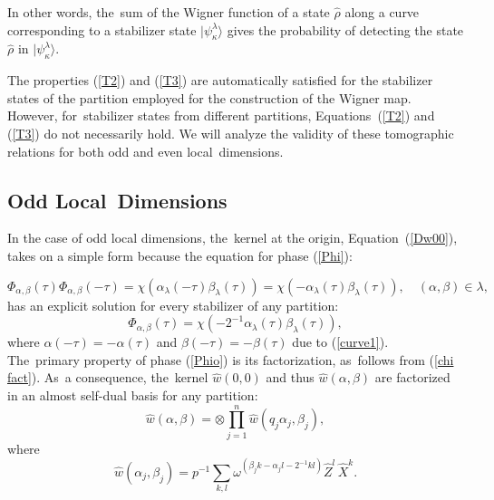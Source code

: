 \documentclass[quantumrep,article,accept,pdftex,moreauthors]{Definitions/mdpi}
\begin{document}
In other words, the~sum of the Wigner function of a state $\hat{\rho}$ along a
curve corresponding to a stabilizer state $|\psi_{\kappa}^{\lambda}\rangle$
gives the probability of detecting the state $\hat{\rho}$ in
$|\psi_{\kappa}^{\lambda}\rangle$.

The properties (\ref{T2}) and (\ref{T3}) are automatically satisfied for the
stabilizer states of the partition employed for the construction of the Wigner
map. However, for~stabilizer states from different partitions, Equations~(\ref{T2})
and (\ref{T3}) do not necessarily hold. We will analyze the validity of these
tomographic relations for both odd and even local~dimensions.

\subsection{Odd Local~Dimensions}

In the case of odd local dimensions, the~kernel at the origin, Equation~(\ref{Dw00}),
takes on a simple form because the equation for  phase (\ref{Phi}): 

\begin{equation*}
  \Phi_{\alpha,\beta}(\tau) \Phi_{\alpha,\beta}(-\tau)
  = \chi\left(\alpha_{\lambda}(-\tau)\beta_{\lambda}(\tau)\right)
  = \chi\left(-\alpha_{\lambda}(\tau)\beta_{\lambda}(\tau)\right),
  \quad (\alpha,\beta) \in \lambda,
\end{equation*}
has an explicit solution for every stabilizer of any partition:
\begin{equation}
  \Phi_{\alpha,\beta }(\tau)
  = \chi\left( -2^{-1}\alpha_{\lambda}(\tau)\beta_{\lambda}(\tau)\right),
  \label{Phio}
\end{equation}
where $\alpha(-\tau)=-\alpha(\tau)$ and $\beta(-\tau)=-\beta(\tau)$ due to
(\ref{curve1}). The~primary property of  phase (\ref{Phio}) is its
factorization, as~follows from (\ref{chi fact}). As~a consequence, the~kernel
$\hat{w}\left(0,0\right)$ and thus $\hat{w}\left(\alpha,\beta\right)$ are
factorized in an almost self-dual basis for any partition:
\begin{equation}
  \hat{w}\left( \alpha,\beta \right)
  = \otimes \prod\limits_{j=1}^{n}\hat{w}\left(
    q_{j}\alpha_{j},\beta_{j}
  \right),
  \label{oddF}
\end{equation}
where
\begin{equation*}
  \hat{w}(\alpha_{j},\beta_{j})
  = p^{-1} \sum_{k,l} \omega^{(\beta_{j} k - \alpha_{j} l - 2^{-1} k l)}
  \hat{Z}^{l} \,\hat{X}^{k}.
\end{equation*}
\end{document}
